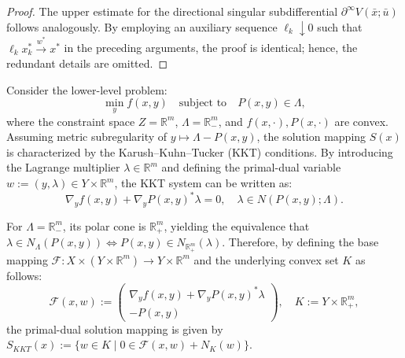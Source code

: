 \documentclass[12pt,twoside,reqno]{amsart}
\theoremstyle{definition}
\numberwithin{equation}{section}
\begin{document}
\begin{proof}
    The upper estimate for the directional singular subdifferential $\partial^\infty V(\bar{x}; \bar{u})$ follows analogously. By employing an auxiliary sequence $\ell_k \downarrow 0$ such that $\ell_k x_k^* \xrightarrow{w^*} x^*$ in the preceding arguments, the proof is identical; hence, the redundant details are omitted.
\end{proof}

Consider the lower-level problem:
\begin{equation}\label{eq:example_of_sdic}
    \min_y f(x, y) \quad \text{subject to} \quad P(x, y) \in \Lambda,
\end{equation}
where the constraint space $Z = \mathbb{R}^m$, $\Lambda = \mathbb{R}^m_-$, and $f(x, \cdot),P(x, \cdot)$ are convex.  
Assuming metric subregularity of $y\mapsto \Lambda-P(x,y)$, the solution mapping $S(x)$ is characterized by the Karush--Kuhn--Tucker (KKT) conditions. By introducing the Lagrange multiplier $\lambda \in \mathbb{R}^m$ and defining the primal-dual variable $w := (y, \lambda) \in Y \times \mathbb{R}^m$, the KKT system can be written as:
\begin{equation*}
    \nabla_y f(x, y) + \nabla_y P(x, y)^* \lambda = 0, \quad \lambda \in N(P(x, y);\Lambda).
\end{equation*}

For $\Lambda = \mathbb{R}^m_-$, its polar cone is $\mathbb{R}^m_+$, yielding the equivalence that $\lambda \in N_\Lambda(P(x,y)) \iff P(x,y) \in N_{\mathbb{R}^m_+}(\lambda)$. Therefore, by defining the base mapping $\mathcal{F}: X \times (Y \times \mathbb{R}^m) \to Y \times \mathbb{R}^m$ and the underlying convex set $K$ as follows:
\begin{equation*}
    \mathcal{F}(x, w) := 
    \begin{pmatrix} 
        \nabla_y f(x, y) + \nabla_y P(x, y)^* \lambda \\ 
        -P(x, y) 
    \end{pmatrix}, \quad 
    K := Y \times \mathbb{R}^m_+,
\end{equation*}
the primal-dual solution mapping is given by $S_{KKT}(x) := \{ w \in K \mid 0 \in \mathcal{F}(x, w) + N_K(w) \}$. 
\end{document}
